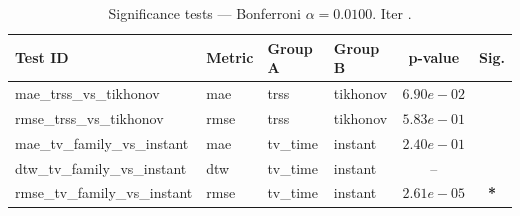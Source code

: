 ﻿%
\begin{table}[ht]
\centering
\caption[EEG reconstruction - Iteration it23b]{Significance tests — Bonferroni $\alpha=0.0100$. Iter .}
\label{tab:sig_it23b_knng_3syn}
\small
\begin{tabular}{llllcc}
\toprule
Test ID & Metric & Group A & Group B & p-value & Sig. \\
\midrule
mae\_trss\_vs\_tikhonov & mae & trss & tikhonov & $6.90e-02$ &  \\
rmse\_trss\_vs\_tikhonov & rmse & trss & tikhonov & $5.83e-01$ &  \\
mae\_tv\_family\_vs\_instant & mae & tv\_time & instant & $2.40e-01$ &  \\
dtw\_tv\_family\_vs\_instant & dtw & tv\_time & instant & -- &  \\
rmse\_tv\_family\_vs\_instant & rmse & tv\_time & instant & $2.61e-05$ & \textbf{*} \\
\bottomrule
\end{tabular}
\end{table}







